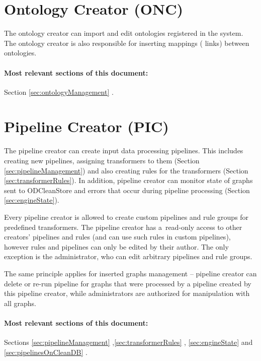 \section[Ontology Creator]{Ontology Creator (ONC)}
\label{sec:onc}
	The ontology creator can import and edit ontologies registered in the system. The ontology creator is also responsible for inserting mappings ( links) between ontologies.

	\paragraph{Most relevant sections of this document:} Section \ref{sec:ontologyManagement} .

\section[Pipeline Creator]{Pipeline Creator (PIC)}
\label{sec:pic}
	The pipeline creator can create input data processing pipelines. This includes creating new pipelines, assigning transformers to them (Section \ref{sec:pipelineManagement}) and also creating rules for the transformers (Section \ref{sec:transformerRules}). In addition, pipeline creator can monitor state of graphs sent to ODCleanStore and errors that occur during pipeline processing (Section \ref{sec:engineState}).

	Every pipeline creator is allowed to create custom pipelines and rule groups for predefined transformers. The pipeline creator has a~read-only access to other creators' pipelines and rules (and can use such rules in custom pipelines), however rules and pipelines can only be edited by their author. The only exception is the administrator, who can edit arbitrary pipelines and rule groups.

	 The same principle applies for inserted graphs management -- pipeline creator can delete or re-run pipeline for graphs that were processed by a pipeline created by this pipeline creator, while administrators are authorized for manipulation with all graphs.

	\paragraph{Most relevant sections of this document:} Sections \ref{sec:pipelineManagement} ,\linebreak[4] \ref{sec:transformerRules} , \ref{sec:engineState}  and \linebreak[4] \ref{sec:pipelinesOnCleanDB} .
	
